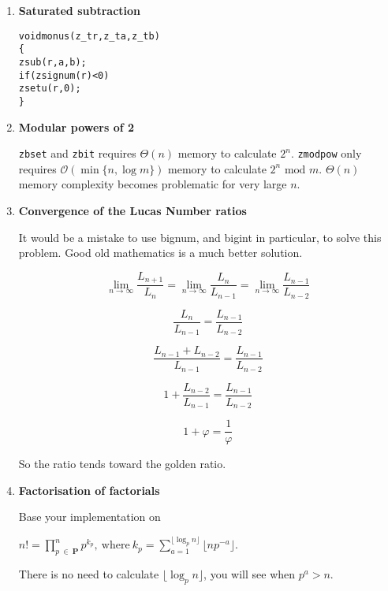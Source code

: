 \begin{enumerate}[label=\textbf{\arabic*}.]

\item \textbf{Saturated subtraction}

\vspace{-1em}
\begin{alltt}
void monus(z_t r, z_t a, z_t b)
\{
    zsub(r, a, b);
    if (zsignum(r) < 0)
        zsetu(r, 0);
\}
\end{alltt}
\vspace{-1em}


\item \textbf{Modular powers of 2}

\texttt{zbset} and \texttt{zbit} requires $\Theta(n)$
memory to calculate $2^n$. \texttt{zmodpow} only
requires $\mathcal{O}(\min \{n, \log m\})$ memory
to calculate $2^n \text{ mod } m$. $\Theta(n)$
memory complexity becomes problematic for very
large $n$.


\item \textbf{Convergence of the Lucas Number ratios}

It would be a mistake to use bignum, and bigint in particular,
to solve this problem. Good old mathematics is a much better solution.

$$ \lim_{n \to \infty} \frac{L_{n + 1}}{L_n} = \lim_{n \to \infty} \frac{L_{n}}{L_{n - 1}} = \lim_{n \to \infty} \frac{L_{n - 1}}{L_{n - 2}} $$

$$ \frac{L_{n}}{L_{n - 1}} = \frac{L_{n - 1}}{L_{n - 2}} $$

$$ \frac{L_{n - 1} + L_{n - 2}}{L_{n - 1}} = \frac{L_{n - 1}}{L_{n - 2}} $$

$$ 1 + \frac{L_{n - 2}}{L_{n - 1}} = \frac{L_{n - 1}}{L_{n - 2}} $$

$$ 1 + \varphi = \frac{1}{\varphi} $$

So the ratio tends toward the golden ratio.



\item \textbf{Factorisation of factorials}

Base your implementation on

\( \displaystyle{
    n! = \prod_{p~\in~\textbf{P}}^{n} p^{k_p}, ~\text{where}~
    k_p = \sum_{a = 1}^{\lfloor \log_p n \rfloor} \lfloor np^{-a} \rfloor.
}\)

There is no need to calculate $\lfloor \log_p n \rfloor$,
you will see when $p^a > n$.




\end{enumerate}
